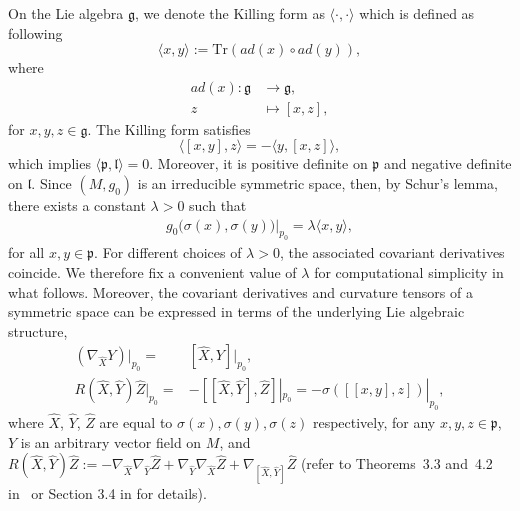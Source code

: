 \documentclass[12pt]{amsart}
\begin{document}
On the Lie algebra $\mathfrak{g}$, we denote the Killing form as $\langle \cdot , \cdot \rangle$ which is defined as following 
\begin{equation}
    \langle x , y \rangle := \mathrm{Tr} \left( ad(x) \circ ad(y) \right),
\end{equation}
where 
\begin{equation}
    \begin{split}
        ad(x): \mathfrak{g} &\rightarrow \mathfrak{g}, \\
               z &\mapsto [x, z],
    \end{split}
\end{equation}
for $x, y, z\in \mathfrak{g}$. The Killing form satisfies 
\begin{equation}\label{compactibility between killing form and lie brack}
    \langle [x,y], z\rangle = -\langle y, [x,z]\rangle, 
\end{equation}
which implies $\langle \mathfrak{p}, \mathfrak{l}\rangle = 0$. Moreover, it is positive definite on $\mathfrak{p}$ and negative definite on $\mathfrak{l}$. Since $(M, g_0)$ is an irreducible symmetric space, then, by Schur's lemma, there exists a constant $\lambda>0$ such that
\begin{align}\label{metric = Killing form}
g_0\bigl(\sigma(x), \sigma(y)\bigr)\big|_{p_0} = \lambda \langle x, y\rangle,
\end{align}
for all $x,y \in \mathfrak{p}$. For different choices of $\lambda>0$, the associated covariant derivatives coincide. We therefore fix a convenient value of $\lambda$ for computational simplicity in what follows. Moreover, the covariant derivatives and curvature tensors of a symmetric space can be expressed in terms of the underlying Lie algebraic structure,
\begin{equation}\label{sectional curvature}
    \begin{split}
        (\nabla_{\hat{X}} Y)|_{p_0} =& [\hat{X}, Y]|_{p_0},\\
        R(\hat{X}, \hat{Y}) \hat{Z}|_{p_0} =& -[[\hat{X}, \hat{Y}], \hat{Z}]|_{p_0} = -\sigma([[x, y], z])|_{p_0},
    \end{split}
\end{equation}
where $\hat{X}$, $\hat{Y}$, $\hat{Z}$ are equal to $\sigma(x),\sigma(y),\sigma(z)$ respectively, for any $x, y, z \in \mathfrak{p}$, $Y$ is an arbitrary vector field on $M$, and $R(\hat{X}, \hat{Y})\hat{Z} := -\nabla_{\hat{X}}\nabla_{\hat{Y}}\hat{Z} + \nabla_{\hat{Y}}\nabla_{\hat{X}}\hat{Z} + \nabla_{[\hat{X}, \hat{Y}]}\hat{Z}$ (refer to Theorems~3.3 and~4.2 in~\cite{He1978} or Section 3.4 in \cite{Ba2015} for details).
\end{document}

